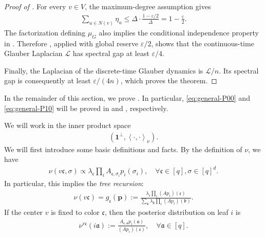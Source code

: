 \documentclass[a4paper,12pt]{article}
\theoremstyle{plain}
\theoremstyle{definition}
\def\*#1{\mathbf{#1}} %
\def\+#1{\mathcal{#1}} %
\def\-#1{\mathrm{#1}} %
\def\!#1{\mathfrak{#1}} %
\def\*#1{\boldsymbol{#1}} %
\def\+#1{\mathcal{#1}} %
\def\-#1{\mathrm{#1}} %
\def\!#1{\mathfrak{#1}} %
\renewcommand{\epsilon}{\varepsilon}
\newcommand{\set}[1]{\left\{#1\right\}}
\newcommand{\inner}[2]{\left\langle #1,#2\right\rangle}
\begin{document}
\begin{proof}[Proof of ]
For every $v\in V$, the maximum-degree assumption gives
\begin{align*}
  \sum_{u\in N(v)}\eta_u
  \leq
  \Delta\cdot\frac{1-\epsilon/2}{\Delta}
  =1-\frac\epsilon2.
\end{align*}
The factorization defining $\mu_G$ also implies the conditional
independence property in .  Therefore
, applied with global reserve $\epsilon/2$,
shows that the continuous-time Glauber Laplacian $\+L$ has spectral gap
at least $\epsilon/4$.

Finally, the Laplacian of the discrete-time Glauber dynamics is
$\+L/n$.  Its spectral gap is consequently at least
$\epsilon/(4n)$, which proves the theorem.
\end{proof}

In the remainder of this section, we prove .
In particular, \eqref{eq:general-P00} and \eqref{eq:general-P10} will be proved in  and , respectively.

We will work in the inner product space
\begin{align*}
  (\*1^\perp, \inner{\cdot}{\cdot}_\nu).
\end{align*}
We will first introduce some basic definitions and facts.
By the definition of $\nu$, we have
%
\begin{align} \label{eq:def-local-mu}
  \nu(v\!c, \sigma) \propto \lambda_{\!c}\prod_{i}A_{\!c,\sigma_i}p_i(\sigma_i), \quad \forall \!c \in [q], \sigma \in [q]^d.
\end{align}
In particular, this implies the \emph{tree recursion}:
\begin{align*}
  \nu(v\!c) = g_{\!c}(\*p) := \frac{\lambda_{\!c} \prod_i (Ap_i)(\!c)}{\sum_{\!b} \lambda_{\!b} \prod_i (Ap_i)(\!b)}.
\end{align*}
If the center $v$ is fixed to color $\!c$, then the posterior distribution on leaf $i$ is
\begin{align*}
  \nu^{v\!c}(i\!a) := \frac{A_{\!c,\!a}p_i(\!a)}{(Ap_i)(\!c)}, \quad \forall \!a \in [q].
\end{align*}
\end{document}
